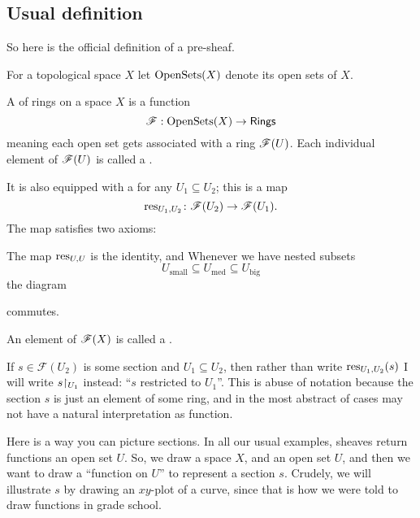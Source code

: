 \subsection{Usual definition}
So here is the official definition of a pre-sheaf.
\begin{definition}
	For a topological space $X$ let $\operatorname{OpenSets}(X)$ denote
	its open sets of $X$.
\end{definition}
\begin{definition}
	A  of rings on a space $X$ is a function
	\[ \mathscr F : \operatorname{OpenSets}(X) \to \mathsf{Rings} \]
	meaning each open set gets associated with a ring $\mathscr F(U)$.
	Each individual element of $\mathscr F(U)$ is called a .

	It is also equipped with a 
	for any $U_1 \subseteq U_2$; this is a map
	\[ \operatorname{res}_{U_1, U_2}
		\colon \mathscr F(U_2) \to \mathscr F(U_1). \]
	The map satisfies two axioms:
	\begin{itemize}
		\ii The map $\operatorname{res}_{U,U}$ is the identity, and
		\ii Whenever we have nested subsets
		\[ U_{\text{small}} \subseteq U_{\text{med}} \subseteq U_{\text{big}} \]
		the diagram
		\begin{center}
		\end{center}
		commutes.
	\end{itemize}
\end{definition}

\begin{definition}
	An element of $\mathscr F(X)$ is called a .
\end{definition}

\begin{abuse}
	If $s \in \mathscr F(U_2)$ is some section and $U_1 \subseteq U_2$,
	then rather than write $\operatorname{res}_{U_1,U_2}(s)$
	I will write $s\restrict{U_1}$ instead:
	``$s$ restricted to $U_1$''.
	This is abuse of notation because the section $s$ is just
	an element of some ring, and in the most abstract of cases
	may not have a natural interpretation as function.
\end{abuse}


Here is a way you can picture sections.
In all our usual examples, sheaves return functions an open set $U$.
So, we draw a space $X$, and an open set $U$,
and then we want to draw a ``function on $U$'' to represent a section $s$.
Crudely, we will illustrate $s$ by drawing an $xy$-plot of a curve,
since that is how we were told to draw functions in grade school.

